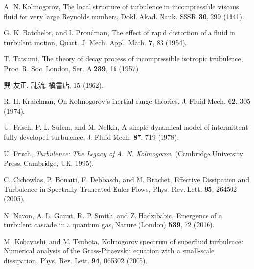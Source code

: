 \documentclass[12pt,a4paper]{jbook}
\begin{document}
    \renewcommand{\bibname}{参考文献}
	\begin{thebibliography}{99}
		A. N. Kolmogorov,
		The local structure of turbulence
		in incompressible viscous fluid for very large Reynolds numbers,
		Dokl. Akad. Nauk. SSSR \textbf{30}, 299 (1941).

		G. K. Batchelor, and I. Proudman,
		The effect of rapid distortion of a fluid in turbulent motion,
		Quart. J. Mech. Appl. Math. \textbf{7}, 83 (1954).

		T. Tatsumi,
		The theory of decay process of incompressible isotropic trubulence,
		Proc. R. Soc. London, Ser. A \textbf{239}, 16 (1957).

		巽 友正,
		乱流,
		槇書店, 15 (1962).
		
  		R. H. Kraichnan,
  		On Kolmogorov's inertial-range theories,
  		J. Fluid Mech. \textbf{62}, 305 (1974).

		U. Frisch, P. L. Sulem, and M. Nelkin,
		A simple dynamical model of intermittent fully developed turbulence,
		J. Fluid Mech. \textbf{87}, 719 (1978).

		U. Frisch, {\it Turbulence: The Legacy of A. N. Kolmogorov},
		(Cambridge University Press, Cambridge, UK, 1995).

        C. Cichowlas, P. Bona\"iti, F. Debbasch, and M. Brachet,
        Effective Dissipation and Turbulence in Spectrally Truncated Euler Flows,
		Phys. Rev. Lett. {\bf 95}, 264502 (2005).

        N. Navon, A. L. Gaunt, R. P. Smith, and Z. Hadzibabic,
        Emergence of a turbulent cascade in a quantum gas,
        Nature (London) \textbf{539}, 72 (2016).

		M. Kobayashi, and M. Tsubota,
		Kolmogorov spectrum of superfluid turbulence:
		Numerical analysis of the Gross-Pitaevskii equation
		with a small-scale dissipation,
		Phys. Rev. Lett. \textbf{94}, 065302 (2005).


\end{thebibliography}
\end{document}
